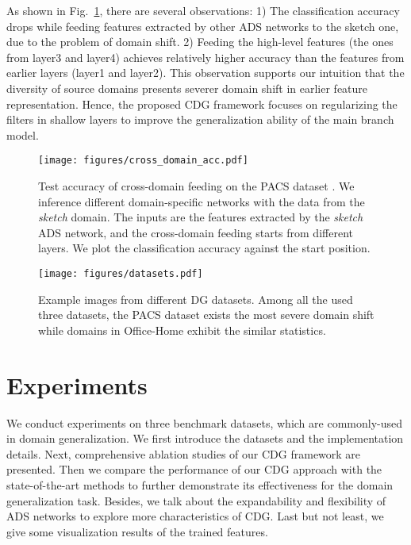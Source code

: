 As shown in Fig.~\ref{fig:cross_domain_acc}, there are several observations: 1) The classification accuracy drops while feeding features extracted by other ADS networks to the sketch one, due to the problem of domain shift. 2) Feeding the high-level features (\eg the ones from layer3 and layer4) achieves relatively higher accuracy than the features from earlier layers (layer1 and layer2). This observation supports our intuition that the diversity of source domains presents severer domain shift in earlier feature representation. Hence, the proposed CDG framework focuses on regularizing the filters in shallow layers to improve the generalization ability of the main branch model.
\begin{figure}[tb]
  \centering
  \texttt{[image: figures/cross\_domain\_acc.pdf]}
  \caption{Test accuracy of cross-domain feeding on the PACS dataset \citep{li2017deeper}. We inference different domain-specific networks with the data from the \textit{sketch} domain. The inputs are the features extracted by the \textit{sketch} ADS network, and the cross-domain feeding starts from different layers. We plot the classification accuracy against the start position.}
  \label{fig:cross_domain_acc}
\end{figure}

\begin{figure*}[htb]
  \centering
  \texttt{[image: figures/datasets.pdf]}
  \caption{Example images from different DG datasets. Among all the used three datasets, the PACS dataset exists the most severe domain shift while domains in Office-Home exhibit the similar statistics.}
  \label{fig:datasets}
\end{figure*}

\section{Experiments}
We conduct experiments on three benchmark datasets, which are commonly-used in domain generalization. We first introduce the datasets and the implementation details. Next, comprehensive ablation studies of our CDG framework are presented. Then we compare the performance of our CDG approach with the state-of-the-art methods to further demonstrate its effectiveness for the domain generalization task. Besides, we talk about the expandability and flexibility of ADS networks to explore more characteristics of CDG. Last but not least, we give some visualization results of the trained features.

